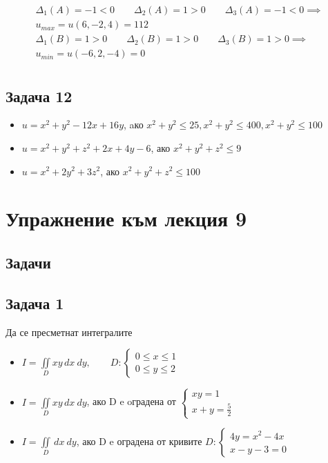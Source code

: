 \documentclass[a4paper,fleqn,12pt]{article}
\theoremstyle{definition}
\begin{document}
\begin{itemize}
\begin{gather*}
\Delta_1(A) = -1 < 0 \qquad \Delta_2(A) = 1>0 \qquad \Delta_3(A) = -1<0 \implies \\
u_{max} = u(6,-2,4) = 112\\
\Delta_1(B) = 1>0 \qquad \Delta_2(B) = 1>0 \qquad \Delta_3(B) = 1>0 \implies \\
u_{min} = u(-6,2,-4) = 0\\
\end{gather*}

\end{itemize}

\subsection*{Задача 12}

\begin{itemize}
\item $u = x^2 + y^2 - 12x + 16y$, aко $ x^2 + y^2 \leq 25, x^2 + y^2 \leq 400, x^2 + y^2 \leq 100$
\item $u = x^2 + y^2+ z^2 +2x + 4y -6 $, ако $x^2 + y^2 + z^2 \leq 9$
\item $u = x^2 + 2y^2+ 3z^2$, ако $x^2 + y^2+ z^2 \leq 100$ 
\end{itemize}


\newpage 
\section{Упражнение към лекция 9}

\subsection{Задачи}

\subsection*{Задача 1}
Да се пресметнат интегралите
\begin{itemize}
\item $I = \iint\limits_D xy \,dx \ dy, \qquad D: \begin{cases} 0 \leq x \leq 1 \\ 0 \leq y \leq 2 \end{cases}$
\item $I = \iint\limits _D xy \,dx \ dy$, ако D e oградена от $\begin{cases} xy = 1 \\ x+y = \frac{5}{2} \end{cases}$
\item $I = \iint\limits _D \,dx \ dy$, ако D e оградена от кривите $D: \begin{cases} 4y = x^2 - 4x \\ x - y - 3 = 0 \end{cases}$
\end{itemize}
\end{document}
